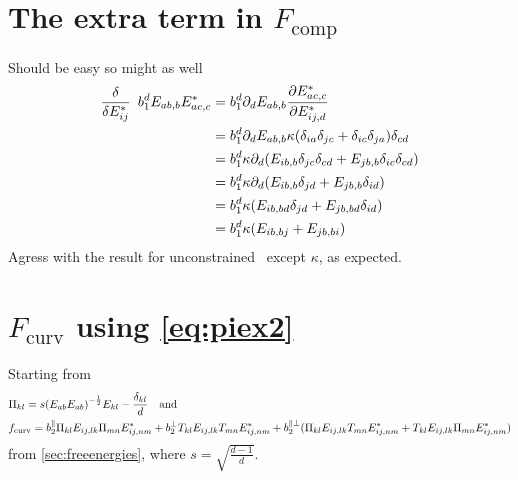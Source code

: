 \documentclass[11pt]{article}
\begin{document}
\section{The extra term in $F_\text{comp}$}
Should be easy so might as well
\begin{align}
    \fdv{E_{ij}^*}\enspace b_1^d E_{ab,b}E_{ac,c}^* &= b_1^d \pp_d E_{ab,b} \pdv{E_{ac,c}^*}{E_{ij,d}^*} \\
    &= b_1^d \pp_d E_{ab,b} \kappa(\delta_{ia}\delta_{jc}+\delta_{ic}\delta_{ja})\delta_{cd} \\
    &= b_1^d \kappa \pp_d (E_{ib,b}\delta_{jc}\delta_{cd} + E_{jb,b}\delta_{ic}\delta_{cd}) \\
    &= b_1^d \kappa \pp_d (E_{ib,b}\delta_{jd} + E_{jb,b}\delta_{id}) \\
    &= b_1^d \kappa (E_{ib,bd}\delta_{jd} + E_{jb,bd}\delta_{id}) \\
    &= b_1^d \kappa (E_{ib,bj} + E_{jb,bi}) \\
\end{align}
Agress with the result for unconstrained \EE\, except $\kappa$, as expected.

\pagebreak
\section{$F_\text{curv}$ using \cref{eq:piex2}}
Starting from
\begin{align}
    &\Pi_{kl} = s \qty(E_{ab}E_{ab})^{-\frac{1}{2}}E_{kl} - \frac{\delta_{kl}}{d} \qq{and} \\
    &f_\text{curv} = b_2^\parallel \Pi_{kl}E_{ij,lk}\Pi_{mn}E_{ij,nm}^* + b_2^\perp T_{kl}E_{ij,lk}T_{mn}E_{ij,nm}^* + b_2^{\parallel\perp}(\Pi_{kl}E_{ij,lk}T_{mn}E_{ij,nm}^* + T_{kl}E_{ij,lk}\Pi_{mn}E_{ij,nm}^*)
\end{align}
from \cref{sec:freeenergies}, where $s=\sqrt{\frac{d-1}{d}}$.
\end{document}
